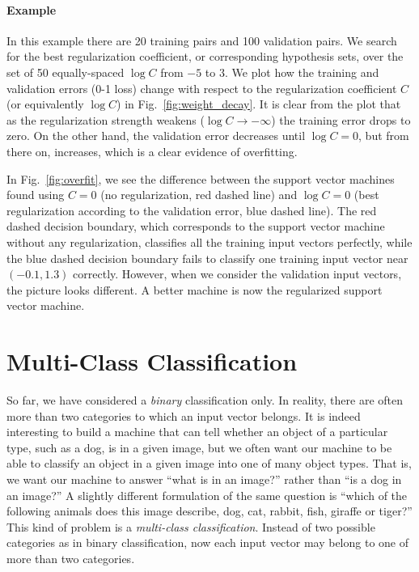 \documentclass{report}
\begin{document}
\paragraph{Example} 

In this example there are 20 training pairs and 100 validation pairs. We search
for the best regularization coefficient, or corresponding hypothesis sets, over
the set of 50 equally-spaced $\log C$ from $-5$ to $3$. We plot how the training
and validation errors (0-1 loss) change with respect to the regularization
coefficient $C$ (or equivalently $\log C$) in Fig.~\ref{fig:weight_decay}. It is
clear from the plot that as the regularization strength weakens ($\log C \to
-\infty$) the training error drops to zero. On the other hand, the validation
error decreases until $\log C = 0$, but from there on, increases, which is a
clear evidence of overfitting. 

In Fig.~\ref{fig:overfit}, we see the difference between the support vector
machines found using $C=0$ (no regularization, red dashed line) and $\log C=0$
(best regularization according to the validation error, blue dashed line). The
red dashed decision boundary, which corresponds to the support vector machine
without any regularization, classifies all the training input vectors perfectly,
while the blue dashed decision boundary fails to classify one training input
vector near $(-0.1, 1.3)$ correctly. However, when we consider the validation
input vectors, the picture looks different. A better machine is now the
regularized support vector machine. 

\section{Multi-Class Classification}
\label{sec:multlogreg}

So far, we have considered a {\it binary} classification only. In reality, there
are often more than two categories to which an input vector belongs.  It is
indeed interesting to build a machine that can tell whether an object of a
particular type, such as a dog, is in a given image, but we often want our
machine to be able to classify an object in a given image into one of many
object types. That is, we want our machine to answer ``what is in an image?''
rather than ``is a dog in an image?'' A slightly different formulation of the
same question is ``which of the following animals does this image describe, dog,
cat, rabbit, fish, giraffe or tiger?'' This kind of problem is a {\it
multi-class classification}. Instead of two possible categories as in binary
classification, now each input vector may belong to one of more than two
categories. 
\end{document}
